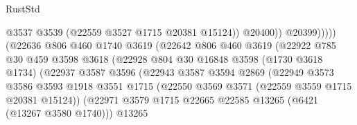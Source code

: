 \begin{lexlean}{RustStd}
\begin{coremodule}
                                                @3537
                                                @3539
                                                (@22559 @3527 @1715 @20381 @15124))
                                              @20400))
                                          @20399)))))
                                (@22636
                                  @806
                                  @460
                                  @1740
                                  @3619
                                  (@22642
                                    @806
                                    @460
                                    @3619
                                    (@22922
                                      @785
                                      @30
                                      @459
                                      @3598
                                      @3618
                                      (@22928
                                        @804
                                        @30
                                        @16848
                                        @3598
                                        (@1730 @3618 @1734)
                                        (@22937
                                          @3587
                                          @3596
                                          (@22943
                                            @3587
                                            @3594
                                            @2869
                                            (@22949
                                              @3573
                                              @3586
                                              @3593
                                              @1918
                                              @3551
                                              @1715
                                              (@22550
                                                @3569
                                                @3571
                                                (@22559 @3559 @1715 @20381 @15124))
                                              (@22971
                                                @3579
                                                @1715
                                                @22665
                                                @22585
                                                @13265
                                                (@6421 (@13267 @3580 @1740)))
                                              @13265

\end{coremodule}
\end{lexlean}
